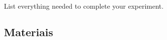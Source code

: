 
List everything needed to complete your experiment.



\subsection{Materiais}





\label{materials}




